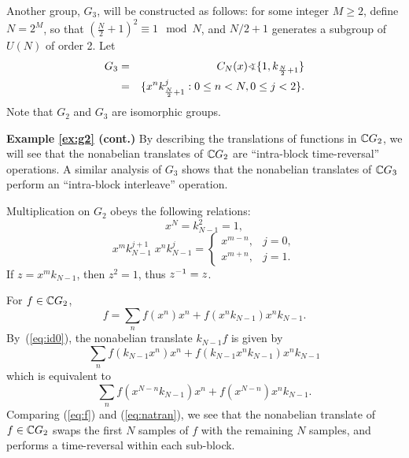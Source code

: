 \begin{example}\label{ex:g3}
Another group, $G_3$, will be constructed as follows: for some 
integer $M \geq 2$, define $N= 2^M$, so that
$\left(\frac{N}{2} + 1\right)^2 \equiv 1 \mod N$,
and $N/2 + 1$ generates a subgroup of $U(N)$ of order 2.
Let 
\begin{eqnarray*}
G_3 &=& C_N(x) \sdp \{1, k_{\frac{N}{2} + 1}\}\\
& =& \{x^n k_{\frac{N}{2}+1}^j : 0 \leq n < N, 0 \leq j < 2\}.
\end{eqnarray*}
Note that $G_2$ and $G_3$ are isomorphic groups.
\end{example}

{\bf Example {\ref{ex:g2}} (cont.)}  
By describing the translations of functions in $\mathbb{C} G_2$,  
we will see that the nonabelian translates of
$\mathbb{C} G_2$ are ``intra-block time-reversal'' operations.
A similar analysis of $G_3$ shows that the nonabelian 
translates of $\mathbb{C} G_3$ perform an ``intra-block interleave''
operation. 

Multiplication on $G_2$ obeys the following relations:
\begin{equation}\label{eq:id0}
  x^N = k_{N-1}^2 = 1,
\end{equation}
\begin{equation}
  x^mk_{N-1}^{j+1} \; x^nk_{N-1}^j = 
  \begin{cases} 
    x^{m-n}, & j=0,\\
    x^{m+n}, & j=1.
  \end{cases}
\end{equation}
If $z=x^mk_{N-1}$, then $z^2=1$, thus $z^{-1}=z$.

For $f\in \mathbb{C} G_2$, 
\begin{equation}\label{eq:f}
  f = \sum_n f(x^n)x^n + f(x^n k_{N-1})x^n k_{N-1}.
\end{equation}
By~(\ref{eq:id0}), the nonabelian translate $k_{N-1}f$
is given by
\[
\sum_n f(k_{N-1}x^n)x^n + f(k_{N-1}x^n k_{N-1})x^n k_{N-1}
\]
which is equivalent to 
\begin{equation}\label{eq:natran}
\sum_n f(x^{N-n} k_{N-1})x^n + f(x^{N-n}) x^n k_{N-1}.
\end{equation}
Comparing (\ref{eq:f}) and (\ref{eq:natran}), we see that
the nonabelian translate of $f\in \mathbb{C} G_2$ swaps the first $N$
samples of $f$ with the remaining $N$ samples, and performs
a time-reversal within each sub-block.


